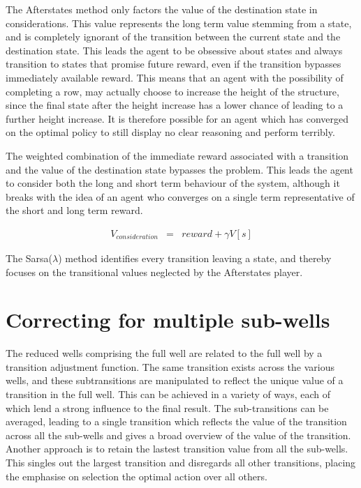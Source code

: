 \documentclass{rucsthesis}
\begin{document}
The Afterstates method only factors the value of the destination state in considerations. This value represents the long term value stemming from a state, and is completely ignorant of the transition between the current state and the destination state. This leads the agent to be obsessive about states and always transition to states that promise future reward, even if the transition bypasses immediately available reward. This means that an agent with the possibility of completing a row, may actually choose to increase the height of the structure, since the final state after the height increase has a lower chance of leading to a further height increase. It is therefore possible for an agent which has converged on the optimal policy to still display no clear reasoning and perform terribly. 

The weighted combination of the immediate reward associated with a transition and the value of the destination state bypasses the problem. This leads the agent to consider both the long and short term behaviour of the system, although it breaks with the idea of an agent who converges on a single term representative of the short and long term reward.

\begin{eqnarray*}
V_{consideration} & = & reward + \gamma V[s]
\end{eqnarray*} 
 
The Sarsa($\lambda$) method identifies every transition leaving a state, and thereby focuses on the transitional values neglected by the Afterstates player.

\section{Correcting for multiple sub-wells}

The reduced wells comprising the full well are related to the full well by a transition adjustment function. The same transition exists across the various wells, and these subtransitions are manipulated to reflect the unique value of a transition in the full well. This can be achieved in a variety of ways, each of which lend a strong influence to the final result. The sub-transitions can be averaged, leading to a single transition which reflects the value of the transition across all the sub-wells and gives a broad overview of the value of the transition. Another approach is to retain the lastest transition value from all the sub-wells. This singles out the largest transition and disregards all other transitions, placing the emphasise on selection the optimal action over all others.
\end{document}
